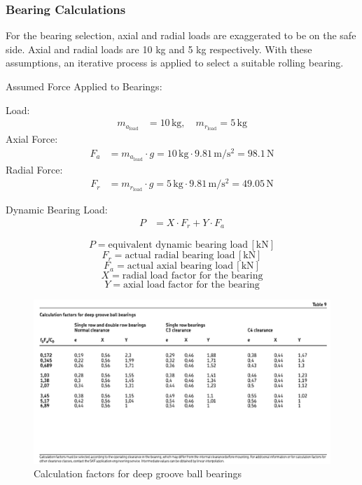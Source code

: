 \documentclass[12pt]{report}
\begin{document}
\subsubsection{Bearing Calculations}

For the bearing selection, axial and radial loads are exaggerated to be on the safe side. Axial and radial loads are 10 kg and 5 kg respectively. With these assumptions, an iterative process is applied to select a suitable rolling bearing.

Assumed Force Applied to Bearings:

Load:
\begin{align}
    m_{a_{\text{load}}} &= 10 \, \mathrm{kg}, \quad m_{r_{\text{load}}} = 5 \, \mathrm{kg}
\end{align}
Axial Force: 
\begin{align}
    F_a &= m_{a_{\text{load}}} \cdot g = 10 \, \mathrm{kg} \cdot 9.81 \, \mathrm{m/s^2} = 98.1 \, \mathrm{N}
\end{align}
Radial Force: 
\begin{align}
    F_r &= m_{r_{\text{load}}} \cdot g = 5 \, \mathrm{kg} \cdot 9.81 \, \mathrm{m/s^2} = 49.05 \, \mathrm{N}
\end{align}

Dynamic Bearing Load:
\begin{align}
    P &= X \cdot F_r + Y \cdot F_a
\end{align}


\[
P = \text{equivalent dynamic bearing load} \, [\mathrm{kN}]
\]
\[
F_r = \text{actual radial bearing load} \, [\mathrm{kN}]
\]
\[
F_a = \text{actual axial bearing load} \, [\mathrm{kN}]
\]
\[
X = \text{radial load factor for the bearing}
\]
\[
Y = \text{axial load factor for the bearing}
\]


\begin{figure}[h]
    \centering
    \includegraphics[width=0.8\linewidth]{bearingfactors.png}
    \caption{Calculation factors for deep groove ball bearings}
    \label{fig:bearingfactors}
\end{figure}
\end{document}
